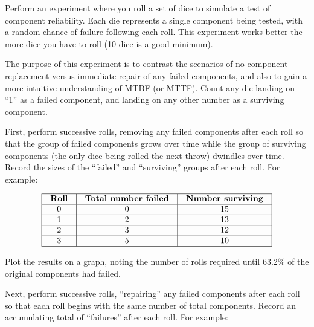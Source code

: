 

Perform an experiment where you roll a set of dice to simulate a test of component reliability.  Each die represents a single component being tested, with a random chance of failure following each roll.  This experiment works better the more dice you have to roll (10 dice is a good minimum).  

The purpose of this experiment is to contrast the scenarios of no component replacement versus immediate repair of any failed components, and also to gain a more intuitive understanding of MTBF (or MTTF).  Count any die landing on ``1'' as a failed component, and landing on any other number as a surviving component.

\vskip 10pt

First, perform successive rolls, removing any failed components after each roll so that the group of failed components grows over time while the group of surviving components (the only dice being rolled the next throw) dwindles over time.  Record the sizes of the ``failed'' and ``surviving'' groups after each roll.  For example:


$$\vbox{\offinterlineskip
\halign{\strut
\vrule \quad\hfil # \ \hfil & 
\vrule \quad\hfil # \ \hfil & 
\vrule \quad\hfil # \ \hfil \vrule \cr
\noalign{\hrule}
%
{\bf Roll} & {\bf Total number failed} & {\bf Number surviving} \cr
%
\noalign{\hrule}
%
0 & 0 & 15 \cr
%
\noalign{\hrule}
%
1 & 2 & 13 \cr
%
\noalign{\hrule}
%
2 & 3 & 12 \cr
%
\noalign{\hrule}
%
3 & 5 & 10 \cr
%
\noalign{\hrule}
} %
}$$ %

Plot the results on a graph, noting the number of rolls required until 63.2\% of the original components had failed.

\vskip 10pt

Next, perform successive rolls, ``repairing'' any failed components after each roll so that each roll begins with the same number of total components.  Record an accumulating total of ``failures'' after each roll.  For example:


